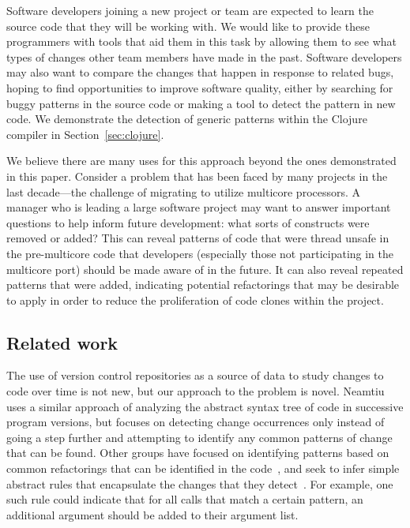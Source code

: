 Software developers joining a new project or team are expected to learn the
source code that they will be working with. We would like to provide these
programmers with tools that aid them in this task by allowing them to see what
types of changes other team members have made in the past. Software developers
may also want to compare the changes that happen in response to related bugs,
hoping to find opportunities to improve software quality, either by searching
for buggy patterns in the source code or making a tool to detect the pattern in
new code. We demonstrate the detection of generic patterns within the
Clojure compiler in Section~\ref{sec:clojure}.

We believe there are many uses for this approach beyond the ones demonstrated
in this paper. Consider a problem that has been faced by many projects in the
last decade---the challenge of migrating to utilize multicore processors.  A
manager who is leading a large software project may want to answer important
questions to help inform future development: what sorts of constructs were
removed or added?  This can reveal patterns of code that were thread unsafe in
the pre-multicore code that developers (especially those not participating in
the multicore port) should be made aware of in the future.  It can also reveal
repeated patterns that were added, indicating potential refactorings that may
be desirable to apply in order to reduce the proliferation of code clones
within the project.


\subsection{Related work}

The use of version control repositories as a source of data to study changes
to code over time is not new, but our approach to the problem is novel.
Neamtiu~\cite{neamtiu05understand} uses a similar approach of analyzing the
abstract syntax tree of code in successive program versions, but focuses on
detecting change occurrences only instead of going a step further and
attempting to identify any common patterns of change that can be found.  
Other groups have focused on identifying patterns based on common
refactorings that can be identified in the code~\cite{weissgerber06identify},
and seek to infer simple abstract rules that encapsulate the changes
that they detect~\cite{kim07automatic}.  For example, one such rule could
indicate that for all calls that match a certain pattern, an additional
argument should be added to their argument list.

